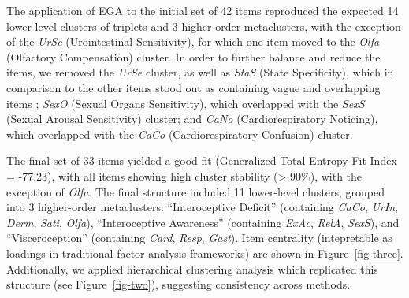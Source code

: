 \documentclass[
  jou,
  floatsintext,
  longtable,
  nolmodern,
  notxfonts,
  notimes,
  colorlinks=true,linkcolor=blue,citecolor=blue,urlcolor=blue]{apa7}
\begin{document}
The application of EGA to the initial set of 42 items reproduced the
expected 14 lower-level clusters of triplets and 3 higher-order
metaclusters, with the exception of the \emph{UrSe} (Urointestinal
Sensitivity), for which one item moved to the \emph{Olfa} (Olfactory
Compensation) cluster. In order to further balance and reduce the items,
we removed the \emph{UrSe} cluster, as well as \emph{StaS} (State
Specificity), which in comparison to the other items stood out as
containing vague and overlapping items ; \emph{SexO} (Sexual Organs
Sensitivity), which overlapped with the \emph{SexS} (Sexual Arousal
Sensitivity) cluster; and \emph{CaNo} (Cardiorespiratory Noticing),
which overlapped with the \emph{CaCo} (Cardiorespiratory Confusion)
cluster.

The final set of 33 items yielded a good fit (Generalized Total Entropy
Fit Index = -77.23), with all items showing high cluster stability
(\textgreater{} 90\%), with the exception of \emph{Olfa}. The final
structure included 11 lower-level clusters, grouped into 3 higher-order
metaclusters: ``Interoceptive Deficit'' (containing \emph{CaCo},
\emph{UrIn}, \emph{Derm}, \emph{Sati}, \emph{Olfa}), ``Interoceptive
Awareness'' (containing \emph{ExAc}, \emph{RelA}, \emph{SexS}), and
``Visceroception'' (containing \emph{Card}, \emph{Resp}, \emph{Gast}).
Item centrality (intepretable as loadings in traditional factor analysis
frameworks) are shown in Figure~\ref{fig-three}. Additionally, we
applied hierarchical clustering analysis which replicated this structure
(see Figure~\ref{fig-two}), suggesting consistency across methods.
\end{document}
